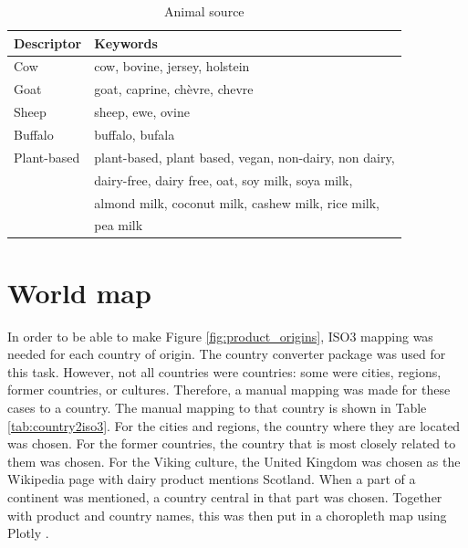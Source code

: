 \documentclass[sigconf]{acmart-txmm}
\begin{document}
\begin{table}[h]
    \vspace{0.5em}

    \begin{subtable}{\linewidth}
        \centering
        \caption{Animal source}
        \label{tab:animal_descriptors}
        \begin{tabular}{ll}
            \toprule
            \textbf{Descriptor} & \textbf{Keywords} \\
            \midrule
            Cow & cow, bovine, jersey, holstein \\
            Goat & goat, caprine, chèvre, chevre \\
            Sheep & sheep, ewe, ovine \\
            Buffalo & buffalo, bufala \\
            Plant-based & plant-based, plant based, vegan, non-dairy, non dairy, \\
            & dairy-free, dairy free, oat, soy milk, soya milk, \\
            & almond milk, coconut milk, cashew milk, rice milk, \\
            & pea milk \\
            \bottomrule
        \end{tabular}
    \end{subtable}
\end{table}

\newpage
\section{World map} \label{app:country2iso3}
In order to be able to make Figure \ref{fig:product_origins}, ISO3 mapping was needed for each country of origin. 
The country converter package \cite{Stadler2017} was used for this task.
However, not all countries were countries: some were cities, regions, former countries, or cultures.
Therefore, a manual mapping was made for these cases to a country.
The manual mapping to that country is shown in Table \ref{tab:country2iso3}.
For the cities and regions, the country where they are located was chosen.
For the former countries, the country that is most closely related to them was chosen.
For the Viking culture, the United Kingdom was chosen as the Wikipedia page with dairy product mentions Scotland.
When a part of a continent was mentioned, a country central in that part was chosen.
Together with product and country names, this was then put in a choropleth map using Plotly \cite{Kruchten_An_interactive_open-source_2025}.
\end{document}

